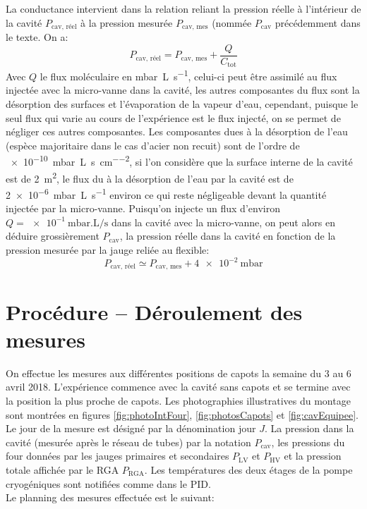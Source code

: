La conductance intervient dans la relation reliant la pression réelle à l'intérieur de la cavité $P_\text{cav, réel}$ à la pression mesurée $P_\text{cav, mes}$ (nommée $P_\text{cav}$ précédemment dans le texte. On a:
\begin{equation}
    P_\text{cav, réel} = P_\text{cav, mes}+\frac{Q}{C_\text{tot}}\label{eq:corrPression}
\end{equation}
Avec $Q$ le flux moléculaire en \si{\milli\bar.\liter\per\second}, celui-ci peut être assimilé au flux injectée avec la micro-vanne dans la cavité, les autres composantes du flux sont la désorption des surfaces et l'évaporation de la vapeur d'eau, cependant, puisque le seul flux qui varie au cours de l'expérience est le flux injecté, on se permet de négliger ces autres composantes. Les composantes dues à la désorption de l'eau (espèce majoritaire dans le cas d'acier non recuit) sont de l'ordre de \SI{e-10}{\milli\bar.\liter\per\second\per\centi\meter\squared}\cite{lectureMercier,lectureGrabeski}, si l'on considère que la surface interne de la cavité est de \SI{2}{\meter\squared}, le flux du à la désorption de l'eau par la cavité est de \SI{2e-6}{\milli\bar.\liter\per\second} environ ce qui reste négligeable devant la quantité injectée par la micro-vanne.
Puisqu'on injecte un flux d'environ $Q = \SI{e-1}{\milli\bar.\liter\per\second}$ dans la cavité avec la micro-vanne, on peut alors en déduire grossièrement $P_\text{cav}$, la pression réelle dans la cavité en fonction de la pression mesurée par la jauge reliée au flexible:
\[P_\text{cav, réel} \simeq P_\text{cav, mes} + \SI{4e-2}{\milli\bar}\]

\chapter{Procédure -- Déroulement des mesures}
On effectue les mesures aux différentes positions de capots la semaine du 3 au 6 avril 2018. L'expérience commence avec la cavité sans capots et se termine avec la position la plus proche de capots. Les photographies illustratives du montage sont montrées en figures \ref{fig:photoIntFour}, \ref{fig:photosCapots} et \ref{fig:cavEquipee}.\\
Le jour de la mesure est désigné par la dénomination jour $J$. La pression dans la cavité (mesurée après le réseau de tubes) par la notation $P_\text{cav}$, les pressions du four données par les jauges primaires et secondaires $P_\text{LV}$ et $P_\text{HV}$ et la pression totale affichée par le RGA $P_\text{RGA}$. Les températures des deux étages de la pompe cryogéniques sont notifiées comme dans le PID.\\
Le planning des mesures effectuée est le suivant:

